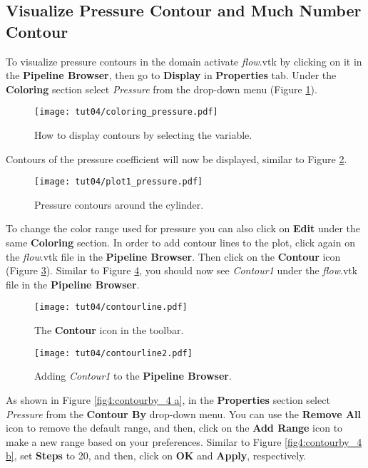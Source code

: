 \subsection{Visualize Pressure Contour and Much Number Contour}
To visualize pressure contours in the domain activate \textit{flow}.vtk by clicking on it in the \textbf{Pipeline Browser}, then go to \textbf{Display} in \textbf{Properties} tab. Under the \textbf{Coloring} section select \textit{Pressure} from the drop-down menu (Figure \ref{fig4:pressure_coloring_4}).
\begin{figure}[htbp]
    \centering
    \texttt{[image: tut04/coloring\_pressure.pdf]}
    \caption{How to display contours by selecting the variable.}
    \label{fig4:pressure_coloring_4}
\end{figure}
Contours of the pressure coefficient will now be displayed, similar to Figure \ref{fig4:pressure_plot1_4}.
\begin{figure}[htbp]
    \centering
    \texttt{[image: tut04/plot1\_pressure.pdf]}
    \caption{Pressure contours around the cylinder.}
    \label{fig4:pressure_plot1_4}
\end{figure}
To change the color range used for pressure you can also click on \textbf{Edit} under the same \textbf{Coloring} section. In order to add contour lines to the plot, click again on the \textit{flow}.vtk file in the \textbf{Pipeline Browser}. Then click on the \textbf{Contour} icon (Figure \ref{fig4:contourline1_4}). Similar to Figure \ref{fig4:contourline2_4}, you should now see \textit{Contour1} under the \textit{flow}.vtk file in the \textbf{Pipeline Browser}. 
\begin{figure}[htbp]
    \centering
    \texttt{[image: tut04/contourline.pdf]}
    \caption{The \textbf{Contour} icon in the toolbar.}
    \label{fig4:contourline1_4}
\end{figure}
\begin{figure}[htbp]
    \centering
    \texttt{[image: tut04/contourline2.pdf]}
    \caption{Adding \textit{Contour1} to the \textbf{Pipeline Browser}.}
    \label{fig4:contourline2_4}
\end{figure}
As shown in Figure \ref{fig4:contourby_4 a}, in the \textbf{Properties} section select \textit{Pressure} from the \textbf{Contour By} drop-down menu. You can use the \textbf{Remove All} icon to remove the default range, and then, click on the \textbf{Add Range} icon to make a new range based on your preferences. Similar to Figure \ref{fig4:contourby_4 b}, set \textbf{Steps} to 20, and then, click on \textbf{OK} and \textbf{Apply}, respectively.
